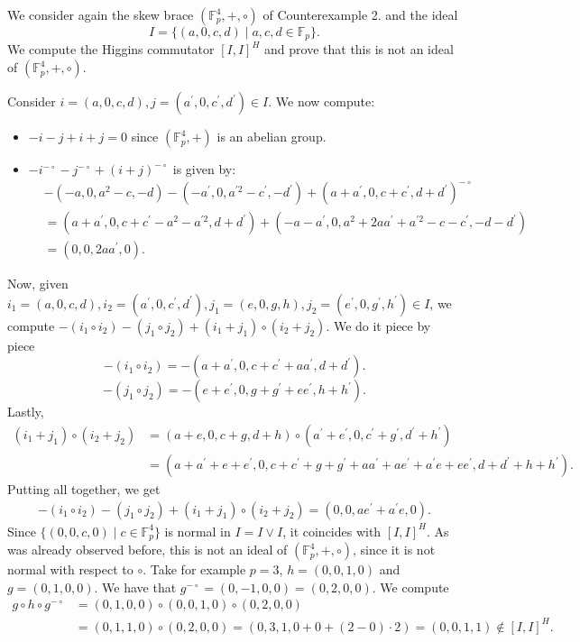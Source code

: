 \documentclass{amsart}
\theoremstyle{definition}
\begin{document}
We consider again the skew brace $(\mathbb{F}_p^4,+,\circ)$ of Counterexample 2. and the ideal
\[
I=\{(a,0,c,d) \mid a,c,d \in \mathbb{F}_p\}.
\]
We compute the Higgins commutator $[I,I]^H$ and prove that this is not an ideal of $(\mathbb{F}_p^4,+,\circ)$.

Consider $i=(a,0,c,d), j=(a^\prime,0,c^\prime,d^\prime) \in I$. We now compute: 
\begin{itemize}
    \item $-i-j+i+j = 0$ since $(\mathbb{F}_p^4,+)$ is an abelian group.
    \item $ -i^{-\circ}-j^{-\circ}+(i+j)^{- \circ}$ is given by:
    \begin{align*}
     &-(-a,0,a^2-c,-d) - (-a^\prime,0,a^{\prime 2}-c^\prime, -d^\prime) + (a+a^\prime, 0, c+c^\prime,d+d^\prime)^{-\circ}\\
    &= (a+a^\prime,0,c+c^\prime-a^2-a^{\prime 2},d+d^\prime) + (-a-a^\prime,0,a^2+2aa^\prime+a^{\prime 2} -c-c^\prime,-d-d^\prime)\\
    &=(0,0,2aa^\prime,0).
    \end{align*}
\end{itemize}
Now, given $i_1=(a,0,c,d), i_2=(a^\prime,0,c^\prime,d^\prime), j_1=(e,0,g,h),j_2=(e^\prime,0,g^\prime,h^\prime) \in I$, we compute $-(i_1 \circ i_2) - (j_1 \circ j_2) + (i_1 +j_1)\circ (i_2 +j_2)$. We do it piece by piece 
$$
-(i_1\circ i_2) = -(a+a^\prime,0,c+c^\prime+aa^\prime,d+d^\prime).
$$
$$
-(j_1 \circ j_2) = -(e+e^\prime, 0, g+g^\prime + ee^\prime, h+h^\prime).
$$
Lastly,
\begin{align*}
(i_1 +j_1)\circ (i_2 +j_2) &= (a+e,0,c+g,d+h) \circ (a^\prime + e^\prime,0,c^\prime +g^\prime,d^\prime+h^\prime)\\
&=(a+a^\prime+e+e^\prime,0,c+c^\prime+g+g^\prime +aa^\prime +ae^\prime+a^\prime e+e e^\prime, d+d^\prime+h+h^\prime).
\end{align*}
Putting all together, we get 
\begin{align*}
-(i_1 \circ i_2) - (j_1 \circ j_2) + (i_1 +j_1)\circ (i_2 +j_2) = (0,0,ae^\prime+a^\prime e, 0).
\end{align*}
Since $\{ (0,0,c,0) \mid c \in \mathbb{F}_p^4\}$ is normal in $I = I \lor I$, it coincides with $[I,I]^H$. As was already observed before, this is not an ideal of $(\mathbb{F}_p^4,+,\circ)$, since it is not normal with respect to $\circ$. Take for example $p=3$, $h=(0,0,1,0)$ and $g=(0,1,0,0)$. We have that $g^{-\circ}=(0,-1,0,0)=(0,2,0,0)$. We compute
\begin{align*}
    g\circ h\circ g^{-\circ} &=(0,1,0,0) \circ (0,0,1,0) \circ (0,2,0,0)\\
    &=(0,1,1,0) \circ (0,2,0,0)=(0,3,1, 0+0+(2-0)\cdot 2) = (0,0,1,1) \not\in [I,I]^H.
\end{align*}
\end{document}
